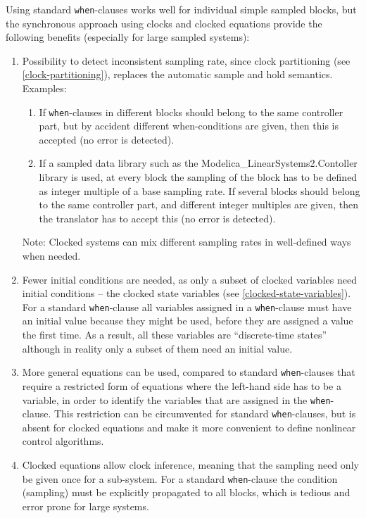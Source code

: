 \begin{nonnormative}
Using standard \lstinline!when!-clauses works well for individual simple sampled blocks, but the synchronous approach using clocks and clocked equations provide the following benefits (especially for large sampled systems):
\begin{enumerate}
\item
  Possibility to detect inconsistent sampling rate, since clock partitioning (see \cref{clock-partitioning}), replaces the automatic sample and hold semantics.
  Examples:
  \begin{enumerate}
  \def\labelenumii{\alph{enumii}.}
  \item
    If \lstinline!when!-clauses in different blocks should belong to the same controller part, but by accident different when-conditions are given, then this is accepted (no error is detected).
  \item
    If a sampled data library such as the Modelica\_LinearSystems2.Contoller library is used, at every block the sampling of the block has to be defined as integer multiple of a base sampling rate.
    If several blocks should belong to the same controller part, and different integer multiples are given, then the translator has to accept this (no error is detected).
  \end{enumerate}
  Note: Clocked systems can mix different sampling rates in well-defined ways when needed.
\item
  Fewer initial conditions are needed, as only a subset of clocked variables need initial conditions -- the clocked state variables (see \cref{clocked-state-variables}).
  For a standard \lstinline!when!-clause all variables assigned in a \lstinline!when!-clause must have an initial value because they might be used, before they are assigned a value the first time.
  As a result, all these variables are ``discrete-time states'' although in reality only a subset of them need an initial value.
\item
  More general equations can be used, compared to standard \lstinline!when!-clauses that require a restricted form of equations where the left-hand side has to be a variable, in order to identify the variables that are assigned in the \lstinline!when!-clause.
  This restriction can be circumvented for standard \lstinline!when!-clauses, but is absent for clocked equations and make it more convenient to define nonlinear control algorithms.
\item
  Clocked equations allow clock inference, meaning that the sampling need only be given once for a sub-system.
  For a standard \lstinline!when!-clause the condition (sampling) must be explicitly propagated to all blocks, which is tedious and error prone for large systems.

\end{enumerate}
\end{nonnormative}
